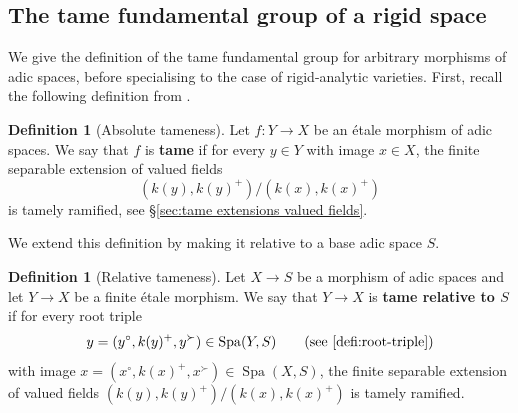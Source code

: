 \documentclass[a4paper,twoside,11pt,reqno]{amsart}
\DeclareMathOperator{\Spa}{Spa}
\theoremstyle{definition}
\newtheorem{defi}[thm]{Definition}
\numberwithin{equation}{subsection}
\begin{document}
\subsection{The tame fundamental group of a rigid space}
\label{ss:tame-pi1-rig}

We give the definition of the tame fundamental group for arbitrary morphisms of adic spaces, before specialising to the case of rigid-analytic varieties. First, recall the following definition from \cite{Hubner2021:AdicTameSite}. 

\begin{defi}[{Absolute tameness}] \label{def:tame-rig-abs}
    Let $f\colon Y\to X$ be an \'etale morphism of adic spaces. We say that $f$ is {\bf tame} if for every $y\in Y$ with image $x\in X$,  the finite separable extension of valued fields 
    \[
        (k(y), k(y)^+)/(k(x), k(x)^+)
    \]
    is tamely ramified, see \S\ref{sec:tame extensions valued fields}.
\end{defi}

We extend this definition by making it relative to a base adic space $S$.

\begin{defi}[Relative tameness] \label{def:tame-rig}
    Let $X\to S$ be a morphism of adic spaces and let $Y\to X$ be a finite \'etale morphism. We say that $Y\to X$ is \textbf{tame relative to $S$} if for every root triple 
    \[
        y= (y^\circ, k(y)^+, y^\succ) \in \Spa(Y, S)
        \qquad \text{(see~\cref{defi:root-triple})}
    \]
    with image $x = (x^\circ, k(x)^+, x^\succ)\in \Spa(X, S)$, the finite separable extension of valued fields $(k(y), k(y)^+)/(k(x), k(x)^+)$ is tamely ramified. 
\end{defi}
\end{document}
